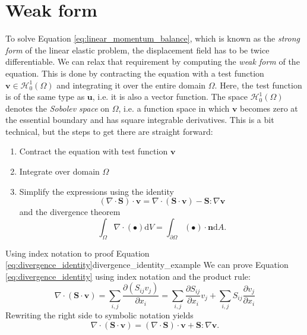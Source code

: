\section{Weak form}
To solve Equation \eqref{eq:linear_momentum_balance}, which is known as the \emph{strong form} of the linear elastic problem, the displacement field has to be twice differentiable. 
We can relax that requirement by computing the \emph{weak form} of the equation. This is done by contracting the equation with a test function $\mathbf{v} \in \mathcal{H}^1_0 (\Omega) $ and integrating it over the entire domain $\Omega$. Here, the test function is of the same type as $\mathbf{u}$, i.e. it is also a vector function. The space $\mathcal{H}^1_0 (\Omega)$ denotes the \emph{Sobolev space} on $\Omega$, i.e. a function space in which $\mathbf{v}$ becomes zero at the essential boundary and has square integrable derivatives. This is a bit technical, but the steps to get there are straight forward: 
\begin{enumerate}
    \item Contract the equation with test function $\mathbf{v}$
    \item Integrate over domain $\Omega$
    \item Simplify the expressions using the identity 
        \begin{equation}
            (\nabla \cdot \mathbf{S}) \cdot \mathbf{v} = \nabla \cdot (\mathbf{S} \cdot \mathbf{v}) - \mathbf{S} : \nabla \mathbf{v}
            \label{eq:divergence_identity}
        \end{equation}
    and the divergence theorem
    \begin{equation}
        \int_\Omega \nabla \cdot (\bullet) \text{d}V = \int_{\partial \Omega} (\bullet) \cdot \mathbf{n} \text{d}A.
        \label{eq:divergence_theorem}
    \end{equation}
\end{enumerate}

\begin{example}{Using index notation to proof Equation \ref{eq:divergence_identity}}{divergence_identity_example} 
    We can prove Equation \ref{eq:divergence_identity} using index notation and the product rule: 
    \begin{equation}
        \nabla \cdot (\mathbf{S} \cdot \mathbf{v}) = \sum_{i,j} \frac{\partial (S_{ij} v_j)}{\partial x_i} = \sum_{i,j}\frac{\partial S_{ij}}{\partial x_i} v_j + \sum_{i,j} S_{ij} \frac{\partial v_j}{\partial x_i}
    \end{equation}
    Rewriting the right side to symbolic notation yields
    \begin{equation}
        \nabla \cdot (\mathbf{S} \cdot \mathbf{v}) = (\nabla \cdot \mathbf{S}) \cdot \mathbf{v} + \mathbf{S} : \nabla \mathbf{v}.
    \end{equation}
\end{example}

